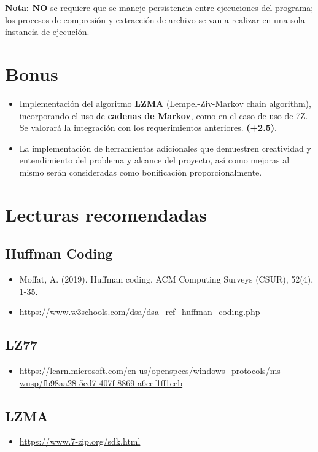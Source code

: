 \documentclass{article}
\begin{document}
\textbf{Nota: NO} se requiere que se maneje persistencia entre ejecuciones del programa; los procesos de compresión y extracción de archivo se van a realizar en una sola instancia de ejecución.

\section{Bonus} 
\begin{itemize}
    \item Implementación del algoritmo \textbf{LZMA} (Lempel-Ziv-Markov chain algorithm), incorporando el uso de \textbf{cadenas de Markov}, como en el caso de uso de 7Z. Se valorará la integración con los requerimientos anteriores. \textbf{(+2.5)}.
    \item La implementación de herramientas adicionales que demuestren creatividad y entendimiento del problema y alcance del proyecto, así como mejoras al mismo serán consideradas como bonificación proporcionalmente.
\end{itemize}
\section{Lecturas recomendadas} 
\subsection{Huffman Coding}
\begin{itemize}
    \item Moffat, A. (2019). Huffman coding. ACM Computing Surveys (CSUR), 52(4), 1-35.
    \item \url{https://www.w3schools.com/dsa/dsa_ref_huffman_coding.php}
\end{itemize}
\subsection{LZ77}
\begin{itemize}
    \item \url{https://learn.microsoft.com/en-us/openspecs/windows_protocols/ms-wusp/fb98aa28-5cd7-407f-8869-a6cef1ff1ccb}
\end{itemize}
\subsection{LZMA}
\begin{itemize}
    \item \url{https://www.7-zip.org/sdk.html}
\end{itemize}
\end{document}

